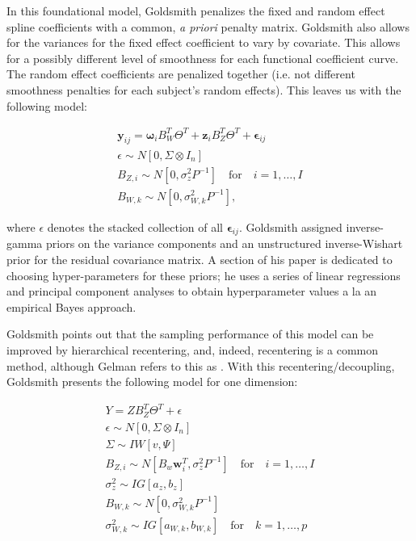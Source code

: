 In this foundational model, Goldsmith penalizes the fixed and random effect spline coefficients with a common, 
\emph{a priori} penalty matrix\cite{goldsmith_assessing_2016}.  
Goldsmith also allows for the variances for the fixed effect coefficient to vary by covariate.  
This allows for a possibly different level of smoothness for each functional coefficient curve.  
The random effect coefficients  are penalized together (i.e. not different smoothness penalties for each subject's random effects).  
This leaves us with the following model:

\begin{equation}
    \begin{split}
        \boldsymbol{y}_{ij} = \boldsymbol{\omega}_iB_W^T\Theta^T + \boldsymbol{z}_{i}B_Z^T\Theta^T + \boldsymbol{\epsilon}_{ij}\\
        \epsilon\sim N[0, \Sigma\otimes I_n]\\
        B_{Z,i} \sim N[0, \sigma_z^2P^{-1}]\quad \text{for} \quad i = 1,\dots, I\\
        B_{W, k} \sim N[0, \sigma_{W,k}^2P^{-1}],
    \end{split}
\end{equation}

\noindent
where \(\epsilon\) denotes the stacked collection of all \(\boldsymbol{\epsilon}_{ij}\).  
Goldsmith assigned inverse-gamma priors on the variance components and an unstructured inverse-Wishart prior for the residual 
covariance matrix\cite{goldsmith_assessing_2016}.  A section of his paper is dedicated to choosing hyper-parameters for these priors; 
he uses a series of linear regressions and principal component analyses to obtain hyperparameter values a la an empirical Bayes approach.   

Goldsmith points out that the sampling performance of this model can be improved by hierarchical recentering, and, indeed, 
recentering is a common method\cite{gelfand_efficient_1995}, although Gelman refers to this as \cite{gelman_bayesian_2013}.  With this recentering/decoupling, Goldsmith presents the following model for one dimension:

\begin{equation}
    \begin{split}
        Y = ZB_Z^T\Theta^T + \epsilon\\
        \epsilon\sim N[0, \Sigma\otimes I_n]\\
        \Sigma \sim IW[v, \Psi]\\
        B_{Z,i} \sim N[B_w \boldsymbol{w}_i^T, \sigma_z^2P^{-1}]\quad \text{for} \quad i = 1,\dots, I\\
        \sigma_z^2 \sim IG[a_z, b_z]\\
        B_{W, k} \sim N[0, \sigma_{W,k}^2P^{-1}]\\
        \sigma_{W,k}^2 \sim IG[a_{W,k}, b_{W,k}]\quad \text{for} \quad k = 1,\dots, p
    \end{split}
    \label{mod1_var}
\end{equation}

